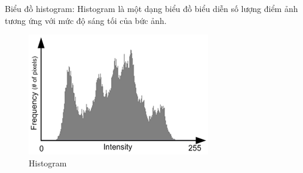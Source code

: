 \documentclass[a4paper,12pt]{report}
\begin{document}
Biểu đồ histogram:
Histogram là một dạng biểu đồ biểu diễn số lượng điểm ảnh tương ứng với mức độ sáng tối của bức ảnh.\\
\begin{figure}[H]
\centering
\includegraphics[scale=0.9]{histogram.png}
\caption{Histogram}
\label{fig:histogram}
\end{figure}
\end{document}
